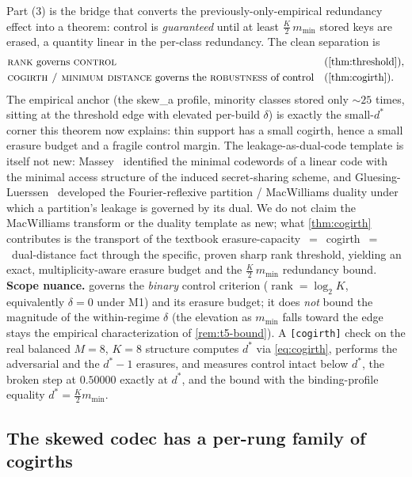 \documentclass[acmsmall,review]{acmart}
\DeclareMathOperator{\rank}{rank}
\begin{document}
Part (3) is the bridge that converts the previously-only-empirical redundancy effect into
a theorem: control is \emph{guaranteed} until at least $\tfrac{K}{2}\,m_{\min}$ stored keys
are erased, a quantity linear in the per-class redundancy. The clean separation is
\[
  \begin{aligned}
    &\text{\textsc{rank} governs \textsc{control}}
      &&\text{(\cref{thm:threshold})}, \\
    &\text{\textsc{cogirth / minimum distance} governs the \textsc{robustness} of control}
      &&\text{(\cref{thm:cogirth})}.
  \end{aligned}
\]
The empirical anchor (the skew\_a profile, minority classes stored only $\sim 25$ times,
sitting at the threshold edge with elevated per-build $\delta$) is exactly the small-$d^\ast$
corner this theorem now explains: thin support has a small cogirth, hence a small erasure
budget and a fragile control margin. The leakage-as-dual-code template is itself not new:
Massey~\cite{massey1993minimal} identified the minimal codewords of a linear code with the
minimal access structure of the induced secret-sharing scheme, and
Gluesing-Luerssen~\cite{gluesingluerssen2014fourier} developed the Fourier-reflexive
partition / MacWilliams duality under which a partition's leakage is governed by its dual.
We do not claim the MacWilliams transform or the duality template as new; what
\cref{thm:cogirth} contributes is the transport of the textbook
erasure-capacity~$=$~cogirth~$=$~dual-distance fact through the specific, proven sharp rank
threshold, yielding an exact, multiplicity-aware erasure budget and the
$\tfrac{K}{2}\,m_{\min}$ redundancy bound. \textbf{Scope nuance.}  governs
the \emph{binary} control criterion ($\rank = \log_2 K$, equivalently $\delta = 0$ under
M1) and its erasure budget; it does \emph{not} bound the magnitude of the within-regime
$\delta$ (the elevation as $m_{\min}$ falls toward the edge stays the empirical
characterization of \cref{rem:t5-bound}). A \texttt{[cogirth]} check on the real balanced
$M = 8$, $K = 8$ structure computes $d^\ast$ via \eqref{eq:cogirth}, performs the
adversarial and the $d^\ast - 1$ erasures, and measures control intact below $d^\ast$, the
broken step at $0.50000$ exactly at $d^\ast$, and the bound with the binding-profile
equality $d^\ast = \tfrac{K}{2}m_{\min}$.

\subsection{The skewed codec has a per-rung family of cogirths}
\label{sec:t5c}
\end{document}
